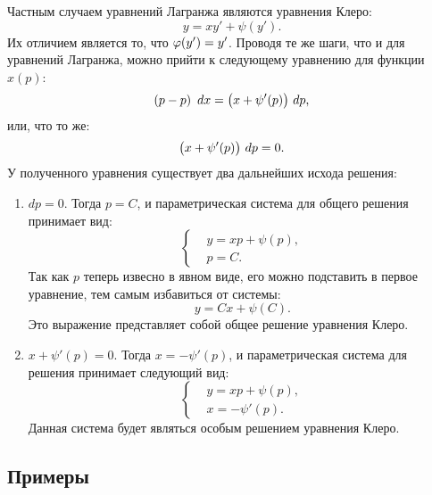 	Частным случаем уравнений Лагранжа являются уравнения Клеро:
	\[ y = xy' + \psi(y'). \]
	Их отличием является то, что $\varphi(y') = y'$. Проводя те же шаги, что и для уравнений Лагранжа, можно прийти к следующему уравнению для функции $x(p)$:
	\[ \left( p - p \right) ~ dx = \bigl( x + \psi'(p) \bigr) ~ dp, \]
	или, что то же:
	\[ \bigl( x + \psi'(p) \bigr) ~ dp = 0. \]
	У полученного уравнения существует два дальнейших исхода решения:
	\begin{enumerate}
		\item $dp = 0$. Тогда $p = C$, и параметрическая система для общего решения принимает вид:
			\[ \left\lbrace \begin{split} &y = xp + \psi(p), \\ &p = C. \end{split} \right. \]
			Так как $p$ теперь извесно в явном виде, его можно подставить в первое уравнение, тем самым избавиться от системы:
			\[ y = Cx + \psi(C). \]
			Это выражение представляет собой общее решение уравнения Клеро.
		\item $x + \psi'(p) = 0$. Тогда $x = - \psi'(p)$, и параметрическая система для решения принимает следующий вид:
			\[ \left\lbrace \begin{split} &y = xp + \psi(p), \\ &x = - \psi'(p). \end{split} \right. \]
			Данная система будет являться особым решением уравнения Клеро.
	\end{enumerate}

	\subsection{Примеры}

